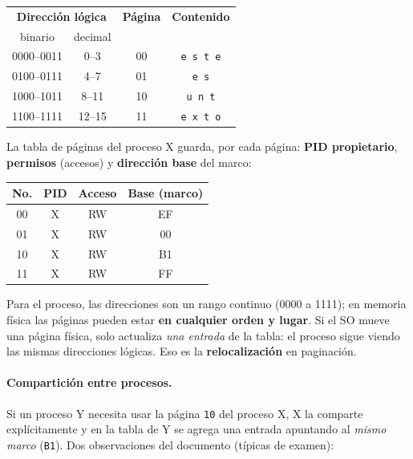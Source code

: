 \documentclass[11pt,letterpaper]{article}
\begin{document}
\begin{center}
\small
\begin{tabular}{cc|cc}
\toprule
\multicolumn{2}{c|}{\textbf{Direcci\'on l\'ogica}} & \textbf{P\'agina} & \textbf{Contenido} \\
binario & decimal & & \\
\midrule
0000--0011 & 0--3   & 00 & \texttt{e s t e} \\
0100--0111 & 4--7   & 01 & \texttt{\ e s\ } \\
1000--1011 & 8--11  & 10 & \texttt{u n\ t} \\
1100--1111 & 12--15 & 11 & \texttt{e x t o} \\
\bottomrule
\end{tabular}
\end{center}

La tabla de p\'aginas del proceso X guarda, por cada p\'agina: \textbf{PID propietario}, \textbf{permisos} (accesos) y \textbf{direcci\'on base} del marco:

\begin{center}
\small
\begin{tabular}{cccc}
\toprule
\textbf{No.} & \textbf{PID} & \textbf{Acceso} & \textbf{Base (marco)} \\
\midrule
00 & X & RW & EF \\
01 & X & RW & 00 \\
10 & X & RW & B1 \\
11 & X & RW & FF \\
\bottomrule
\end{tabular}
\end{center}

\begin{idea}
Para el proceso, las direcciones son un rango continuo (0000 a 1111); en memoria f\'isica las p\'aginas pueden estar \textbf{en cualquier orden y lugar}. Si el SO mueve una p\'agina f\'isica, solo actualiza \emph{una entrada} de la tabla: el proceso sigue viendo las mismas direcciones l\'ogicas. Eso es la \textbf{relocalizaci\'on} en paginaci\'on.
\end{idea}

\paragraph{Compartici\'on entre procesos.} Si un proceso Y necesita usar la p\'agina \texttt{10} del proceso X, X la comparte expl\'icitamente y en la tabla de Y se agrega una entrada apuntando al \emph{mismo marco} (\texttt{B1}). Dos observaciones del documento (t\'ipicas de examen):
\end{document}
